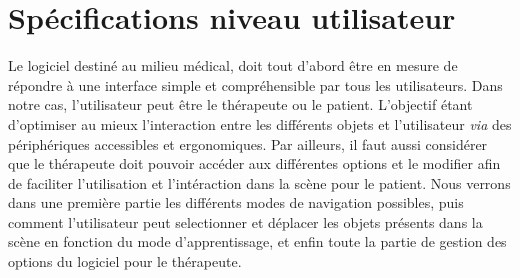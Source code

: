 \section{Spécifications niveau utilisateur}

Le logiciel destiné au milieu médical, doit tout d'abord être en mesure de répondre à une interface simple et compréhensible par tous les utilisateurs. Dans notre cas, l'utilisateur peut être le thérapeute ou le patient. L'objectif étant d'optimiser au mieux l'interaction entre les différents objets et l'utilisateur \textit{via} des périphériques accessibles et ergonomiques. Par ailleurs, il faut aussi considérer que le thérapeute doit pouvoir accéder aux différentes options et le modifier afin de faciliter l'utilisation et l'intéraction dans la scène pour le patient.
\newline
Nous verrons dans une première partie les différents modes de navigation possibles, puis comment l'utilisateur peut selectionner et déplacer les objets présents dans la scène en fonction du mode d'apprentissage, et enfin toute la partie de gestion des options du logiciel pour le thérapeute.


